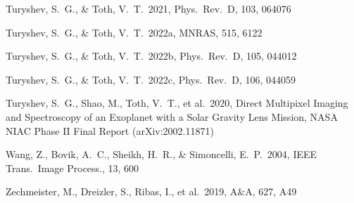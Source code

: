 ﻿\documentclass[twocolumn,10pt]{article}
\begin{document}
\begin{thebibliography}{}
Turyshev, S.~G., \& Toth, V.~T.\ 2021, Phys.\ Rev.\ D, 103, 064076

Turyshev, S.~G., \& Toth, V.~T.\ 2022a, MNRAS, 515, 6122

Turyshev, S.~G., \& Toth, V.~T.\ 2022b, Phys.\ Rev.\ D, 105, 044012

Turyshev, S.~G., \& Toth, V.~T.\ 2022c, Phys.\ Rev.\ D, 106, 044059

Turyshev, S.~G., Shao, M., Toth, V.~T., et al.\ 2020, Direct Multipixel
Imaging and Spectroscopy of an Exoplanet with a Solar Gravity Lens
Mission, NASA NIAC Phase II Final Report (arXiv:2002.11871)

Wang, Z., Bovik, A.~C., Sheikh, H.~R., \& Simoncelli, E.~P.\ 2004, IEEE
Trans.\ Image Process., 13, 600

Zechmeister, M., Dreizler, S., Ribas, I., et al.\ 2019, A\&A, 627, A49

\end{thebibliography}
\end{document}
